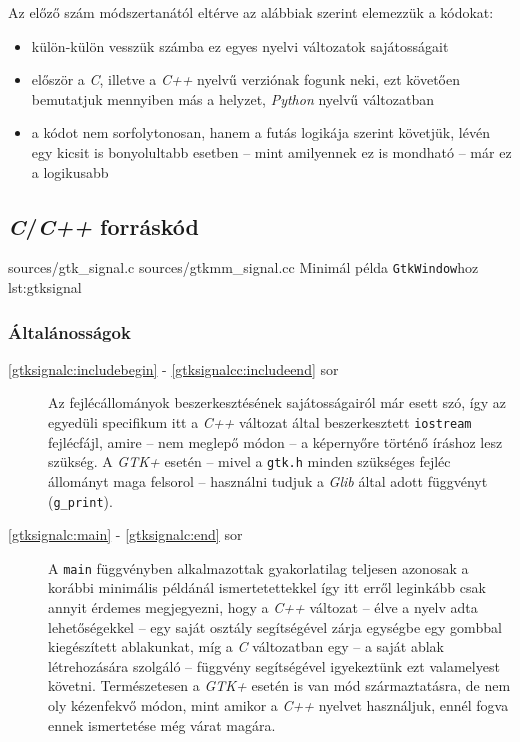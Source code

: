 Az előző szám módszertanától eltérve az alábbiak szerint elemezzük a kódokat:

\begin{itemize}
 \item külön-külön vesszük számba ez egyes nyelvi változatok sajátosságait
 \item először a \textit{C}, illetve a \textit{C++} nyelvű verziónak fogunk neki, ezt követően bemutatjuk mennyiben más a helyzet, \textit{Python} nyelvű változatban
 \item a kódot nem sorfolytonosan, hanem a futás logikája szerint követjük, lévén egy kicsit is bonyolultabb esetben -- mint amilyennek ez is mondható -- már ez a logikusabb
\end{itemize}

\subsection{\textit{C}/\textit{C++} forráskód}

\lstdoublecsource
{sources/gtk_signal.c}
{sources/gtkmm_signal.cc}
{Minimál példa \texttt{GtkWindow}hoz}
{lst:gtksignal}

\subsubsection{Általánosságok}

\begin{description}
 \item[\ref{gtksignalc:includebegin} - \ref{gtksignalcc:includeend} sor] Az fejlécállományok beszerkesztésének sajátosságairól már esett szó, így az egyedüli specifikum itt a \textit{C++} változat által beszerkesztett \texttt{iostream} fejlécfájl, amire -- nem meglepő módon -- a képernyőre történő íráshoz lesz szükség. A \textit{GTK+} esetén -- mivel a \texttt{gtk.h} minden szükséges fejléc állományt maga felsorol -- használni tudjuk a \textit{Glib} által adott függvényt (\texttt{g\_print}).

 \item[\ref{gtksignalc:main} - \ref{gtksignalc:end} sor] A \texttt{main} függvényben alkalmazottak gyakorlatilag teljesen azonosak a korábbi minimális példánál ismertetettekkel így itt erről leginkább csak annyit érdemes megjegyezni, hogy a \textit{C++} változat -- élve a nyelv adta lehetőségekkel -- egy saját osztály segítségével zárja egységbe egy gombbal kiegészített ablakunkat, míg a \textit{C} változatban egy -- a saját ablak létrehozására szolgáló -- függvény segítségével igyekeztünk ezt valamelyest követni. Természetesen a \textit{GTK+} esetén is  van mód származtatásra, de nem oly kézenfekvő módon, mint amikor a \textit{C++} nyelvet használjuk, ennél fogva ennek ismertetése még várat magára.
\end{description}

